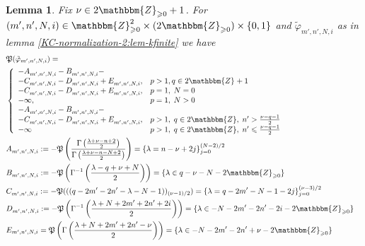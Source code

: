\documentclass{article}
\newcommand{\assign}{:=}
\numberwithin{definition}{section}
\newtheorem{lemma}{Lemma}
\numberwithin{lemma}{section}
\numberwithin{proposition}{section}
{\theorembodyfont{\rmfamily}\newtheorem{remark}{Remark}
\numberwithin{remark}{section}
}
\begin{document}
\begin{lemma}
  \label{KC-normalization-2:lem-Pcomputation}Fix $\nu \in
  2\mathbbm{Z}_{\geqslant 0} + 1$. For $( m', n', N, i) \in
  \mathbbm{Z}_{\geqslant 0}^2 \times ( 2\mathbbm{Z}_{\geqslant 0}) \times \{
  0, 1 \}$ and $\tilde{\varphi}_{m', n', N, i}$ as in lemma
  \ref{KC-normalization-2:lem-kfinite} we have
  \begin{eqnarray}
    & \mathfrak{P} ( \tilde{\varphi}_{m', n', N, i}) = &  \nonumber\\
    & \left\{ \begin{array}{ll}
      - A^{}_{m', n', N, i} - B^{}_{m', n', N, i} - & \\
      - C^{}_{m', n', N, i} - D^{}_{m', n', N, i} + E^{}_{m', n', N, i}, & p >
      1, q \in 2\mathbbm{Z}_{} + 1\\
      - C^{}_{m', n', N, i} - D^{}_{m', n', N, i} + E^{}_{m', n', N, i}, & p =
      1, \; N = 0\\
      - \infty, & p = 1, \; N > 0\\
      - A^{}_{m', n', N, i} - B^{}_{m', n', N, i} - & \\
      - C^{}_{m', n', N, i} - D^{}_{m', n', N, i} + E^{}_{m', n', N, i}, & p >
      1, \; q \in 2\mathbbm{Z}, \; n' > \frac{\nu - q - 1}{2}\\
      - \infty & p > 1, \; q \in 2\mathbbm{Z}, \; n' \leqslant \frac{\nu - q -
      1}{2}
    \end{array} \right. &  \nonumber\\
    & A^{}_{m', n', N, i} \assign -\mathfrak{P} \left( \frac{\Gamma \left(
    \frac{\lambda + \nu - n + 2}{2} \right)}{\Gamma \left( \frac{\lambda + \nu
    - n - N + 2}{2} \right)} \right) = \{ \lambda = n - \nu + 2 j \}_{j =
    0}^{( N - 2) / 2} &  \nonumber\\
    & B^{}_{m', n', N, i} \assign -\mathfrak{P} \left( \Gamma^{- 1} \left(
    \frac{\lambda - q + \nu + N}{2} \right) \right) = \{ \lambda \in q - \nu -
    N - 2\mathbbm{Z}_{\geqslant 0} \} &  \nonumber\\
    & C^{}_{m', n', N, i} \assign -\mathfrak{P} ( ( ( q - 2 m' - 2 n' -
    \lambda - N - 1))_{( \nu - 1) / 2}) = \{ \lambda = q - 2 m' - N - 1 - 2 j
    \}_{j = 0}^{( \nu - 3) / 2} &  \nonumber\\
    & D^{}_{m', n', N, i} \assign -\mathfrak{P} \left( \Gamma^{- 1} \left(
    \frac{\lambda + N + 2 m' + 2 n' + 2 i}{2} \right) \right) = \{ \lambda \in
    - N - 2 m' - 2 n' - 2 i - 2\mathbbm{Z}_{\geqslant 0} \} &  \nonumber\\
    & E_{m', n', N, i} =\mathfrak{P} \left( \Gamma \left( \frac{\lambda + N +
    2 m' + 2 n' - \nu}{2} \right) \right) = \{ \lambda \in - N - 2 m' - 2 n' +
    \nu - 2\mathbbm{Z}_{\geqslant 0} \} &  \nonumber
  \end{eqnarray}
\end{lemma}
\end{document}

